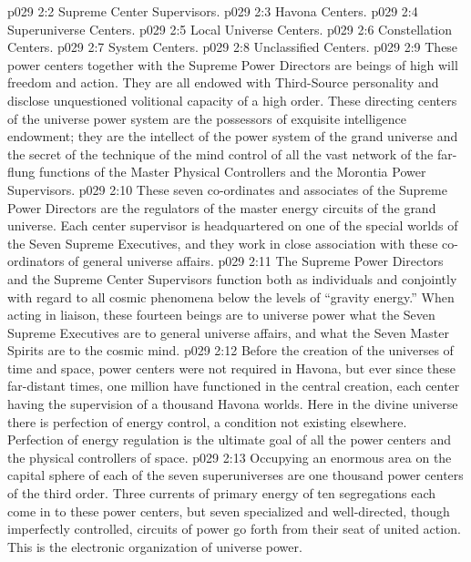 \pc \vs p029 2:2 \bibnobreakspace Supreme Center Supervisors.
\vs p029 2:3 \bibnobreakspace Havona Centers.
\vs p029 2:4 \bibnobreakspace Superuniverse Centers.
\vs p029 2:5 \bibnobreakspace Local Universe Centers.
\vs p029 2:6 \bibnobreakspace Constellation Centers.
\vs p029 2:7 \bibnobreakspace System Centers.
\vs p029 2:8 \bibnobreakspace Unclassified Centers.
\pc \vs p029 2:9 These power centers together with the Supreme Power Directors are beings of high will freedom and action. They are all endowed with Third\hyp{}Source personality and disclose unquestioned volitional capacity of a high order. These directing centers of the universe power system are the possessors of exquisite intelligence endowment; they are the intellect of the power system of the grand universe and the secret of the technique of the mind control of all the vast network of the far\hyp{}flung functions of the Master Physical Controllers and the Morontia Power Supervisors.
\pc \vs p029 2:10 \bibnobreakspace {} These seven co\hyp{}ordinates and associates of the Supreme Power Directors are the regulators of the master energy circuits of the grand universe. Each center supervisor is headquartered on one of the special worlds of the Seven Supreme Executives, and they work in close association with these co\hyp{}ordinators of general universe affairs.
\vs p029 2:11 The Supreme Power Directors and the Supreme Center Supervisors function both as individuals and conjointly with regard to all cosmic phenomena below the levels of “gravity energy.” When acting in liaison, these fourteen beings are to universe power what the Seven Supreme Executives are to general universe affairs, and what the Seven Master Spirits are to the cosmic mind.
\pc \vs p029 2:12 \bibnobreakspace {} Before the creation of the universes of time and space, power centers were not required in Havona, but ever since these far\hyp{}distant times, one million have functioned in the central creation, each center having the supervision of a thousand Havona worlds. Here in the divine universe there is perfection of energy control, a condition not existing elsewhere. Perfection of energy regulation is the ultimate goal of all the power centers and the physical controllers of space.
\pc \vs p029 2:13 \bibnobreakspace {} Occupying an enormous area on the capital sphere of each of the seven superuniverses are one thousand power centers of the third order. Three currents of primary energy of ten segregations each come in to these power centers, but seven specialized and well\hyp{}directed, though imperfectly controlled, circuits of power go forth from their seat of united action. This is the electronic organization of universe power.
